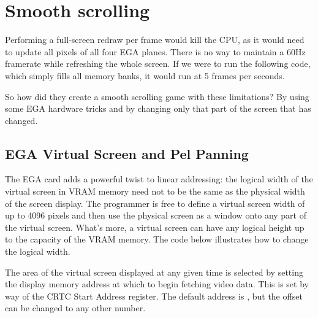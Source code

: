 \documentclass[book.tex]{subfiles}
\begin{document}
\section{Smooth scrolling}
\label{section:adaptive_tile_refresh}
Performing a full-screen redraw per frame would kill the CPU, as it would need to update all pixels of all four EGA planes. There is no way to maintain a 60Hz framerate while refreshing the whole screen. If we were to run the following code, which simply fills all memory banks, it would run at 5 frames per seconds.\\

\par
\begin{minipage}{\textwidth}
  
  \end{minipage}
  \label{ega_write}

\par
So how did they create a smooth scrolling game with these limitations? By using some EGA hardware tricks and by changing only that part of the screen that has changed.
\pagebreak



\subsection{EGA Virtual Screen and Pel Panning}
\label{section:EGA_virtual_screen}

The EGA card adds a powerful twist to linear addressing: the logical width of the virtual screen in VRAM memory need not to be the same as the physical width of the screen display. The programmer is free to define a virtual screen width of up to 4096 pixels and then use the physical screen as a window onto any part of the virtual screen. What's more, a virtual screen can have any logical height up to the capacity of the VRAM memory. The code below illustrates how to change the logical width.\\

\begin{minipage}{\textwidth}
  
  \end{minipage}
  \label{ega_pel_pan}
  \par

The area of the virtual screen displayed at any given time is selected by setting the display memory address at which to begin fetching video data. This is set by way of the CRTC Start Address register. The default address is , but the offset can be changed to any other number. \\
\end{document}
